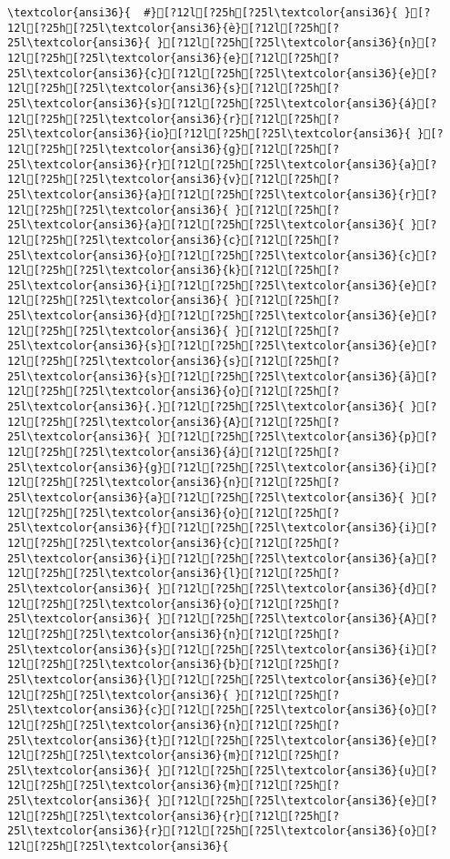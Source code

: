 \documentclass{scrartcl}
\begin{document}
\begin{Verbatim}
\textcolor{ansi36}{  #}[?12l[?25h[?25l\textcolor{ansi36}{ }[?12l[?25h[?25l\textcolor{ansi36}{è}[?12l[?25h[?25l\textcolor{ansi36}{ }[?12l[?25h[?25l\textcolor{ansi36}{n}[?12l[?25h[?25l\textcolor{ansi36}{e}[?12l[?25h[?25l\textcolor{ansi36}{c}[?12l[?25h[?25l\textcolor{ansi36}{e}[?12l[?25h[?25l\textcolor{ansi36}{s}[?12l[?25h[?25l\textcolor{ansi36}{s}[?12l[?25h[?25l\textcolor{ansi36}{á}[?12l[?25h[?25l\textcolor{ansi36}{r}[?12l[?25h[?25l\textcolor{ansi36}{io}[?12l[?25h[?25l\textcolor{ansi36}{ }[?12l[?25h[?25l\textcolor{ansi36}{g}[?12l[?25h[?25l\textcolor{ansi36}{r}[?12l[?25h[?25l\textcolor{ansi36}{a}[?12l[?25h[?25l\textcolor{ansi36}{v}[?12l[?25h[?25l\textcolor{ansi36}{a}[?12l[?25h[?25l\textcolor{ansi36}{r}[?12l[?25h[?25l\textcolor{ansi36}{ }[?12l[?25h[?25l\textcolor{ansi36}{a}[?12l[?25h[?25l\textcolor{ansi36}{ }[?12l[?25h[?25l\textcolor{ansi36}{c}[?12l[?25h[?25l\textcolor{ansi36}{o}[?12l[?25h[?25l\textcolor{ansi36}{c}[?12l[?25h[?25l\textcolor{ansi36}{k}[?12l[?25h[?25l\textcolor{ansi36}{i}[?12l[?25h[?25l\textcolor{ansi36}{e}[?12l[?25h[?25l\textcolor{ansi36}{ }[?12l[?25h[?25l\textcolor{ansi36}{d}[?12l[?25h[?25l\textcolor{ansi36}{e}[?12l[?25h[?25l\textcolor{ansi36}{ }[?12l[?25h[?25l\textcolor{ansi36}{s}[?12l[?25h[?25l\textcolor{ansi36}{e}[?12l[?25h[?25l\textcolor{ansi36}{s}[?12l[?25h[?25l\textcolor{ansi36}{s}[?12l[?25h[?25l\textcolor{ansi36}{ã}[?12l[?25h[?25l\textcolor{ansi36}{o}[?12l[?25h[?25l\textcolor{ansi36}{.}[?12l[?25h[?25l\textcolor{ansi36}{ }[?12l[?25h[?25l\textcolor{ansi36}{A}[?12l[?25h[?25l\textcolor{ansi36}{ }[?12l[?25h[?25l\textcolor{ansi36}{p}[?12l[?25h[?25l\textcolor{ansi36}{á}[?12l[?25h[?25l\textcolor{ansi36}{g}[?12l[?25h[?25l\textcolor{ansi36}{i}[?12l[?25h[?25l\textcolor{ansi36}{n}[?12l[?25h[?25l\textcolor{ansi36}{a}[?12l[?25h[?25l\textcolor{ansi36}{ }[?12l[?25h[?25l\textcolor{ansi36}{o}[?12l[?25h[?25l\textcolor{ansi36}{f}[?12l[?25h[?25l\textcolor{ansi36}{i}[?12l[?25h[?25l\textcolor{ansi36}{c}[?12l[?25h[?25l\textcolor{ansi36}{i}[?12l[?25h[?25l\textcolor{ansi36}{a}[?12l[?25h[?25l\textcolor{ansi36}{l}[?12l[?25h[?25l\textcolor{ansi36}{ }[?12l[?25h[?25l\textcolor{ansi36}{d}[?12l[?25h[?25l\textcolor{ansi36}{o}[?12l[?25h[?25l\textcolor{ansi36}{ }[?12l[?25h[?25l\textcolor{ansi36}{A}[?12l[?25h[?25l\textcolor{ansi36}{n}[?12l[?25h[?25l\textcolor{ansi36}{s}[?12l[?25h[?25l\textcolor{ansi36}{i}[?12l[?25h[?25l\textcolor{ansi36}{b}[?12l[?25h[?25l\textcolor{ansi36}{l}[?12l[?25h[?25l\textcolor{ansi36}{e}[?12l[?25h[?25l\textcolor{ansi36}{ }[?12l[?25h[?25l\textcolor{ansi36}{c}[?12l[?25h[?25l\textcolor{ansi36}{o}[?12l[?25h[?25l\textcolor{ansi36}{n}[?12l[?25h[?25l\textcolor{ansi36}{t}[?12l[?25h[?25l\textcolor{ansi36}{e}[?12l[?25h[?25l\textcolor{ansi36}{m}[?12l[?25h[?25l\textcolor{ansi36}{ }[?12l[?25h[?25l\textcolor{ansi36}{u}[?12l[?25h[?25l\textcolor{ansi36}{m}[?12l[?25h[?25l\textcolor{ansi36}{ }[?12l[?25h[?25l\textcolor{ansi36}{e}[?12l[?25h[?25l\textcolor{ansi36}{r}[?12l[?25h[?25l\textcolor{ansi36}{r}[?12l[?25h[?25l\textcolor{ansi36}{o}[?12l[?25h[?25l\textcolor{ansi36}{ 
\end{Verbatim}
\end{document}
